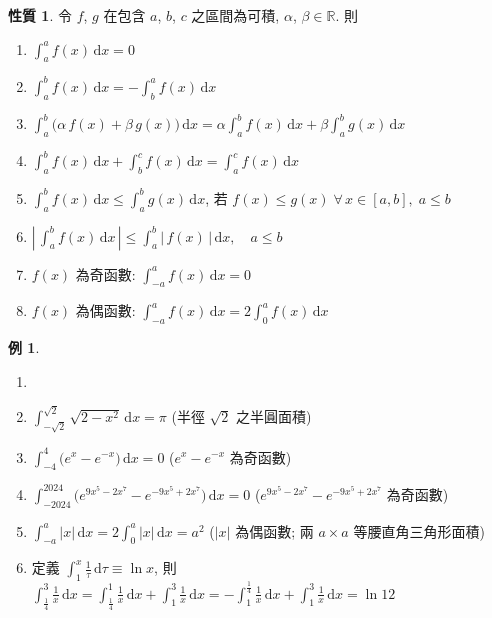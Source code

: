 \documentclass[12pt,a4paper]{extarticle}
\newcommand{\ds}{\displaystyle}
\theoremstyle{definition}
\newtheorem*{prp}{性質}
\newtheorem*{ex}{例}
\begin{document}
\begin{prp}
  令 $f$, $g$ 在包含 $a$, $b$, $c$ 之區間為可積, $\alpha$, $\beta\in\mathbb{R}$. 則
  \begin{multicols}{2}
    \begin{enumerate}\setlength{\itemsep}{0pt}
      \item $\ds\int_a^a f(x)\,\mathrm{d}x = 0$
      \item $\ds\int_a^b f(x)\,\mathrm{d}x = -\int_b^a f(x)\,\mathrm{d}x$
      \item $\ds\int_a^b \big(\alpha\,f(x) + \beta\,g(x)\big)\,\mathrm{d}x = \alpha\int_a^b f(x)\,\mathrm{d}x + \beta\int_a^b g(x)\,\mathrm{d}x$
      \item $\ds\int_a^b f(x)\,\mathrm{d}x + \int_b^c f(x)\,\mathrm{d}x = \int_a^c f(x)\,\mathrm{d}x$
      \item $\ds\int_a^b f(x)\,\mathrm{d}x\leqslant\int_a^b g(x)\,\mathrm{d}x$, 若 $f(x)\leqslant g(x)\;\forall\,x\in[a, b],\;a\leqslant b$
      \item $\ds\left|\,\int_a^b f(x)\,\mathrm{d}x\,\right|\leqslant \int_a^b \left|\,f(x)\,\right|\,\mathrm{d}x, \quad a\leqslant b$ 
      \item $f(x)$ 為奇函數: $\ds\int_{-a}^a f(x)\,\mathrm{d}x = 0$
      \item $f(x)$ 為偶函數: $\ds\int_{-a}^a f(x)\,\mathrm{d}x = 2\int_0^a f(x)\,\mathrm{d}x$
    \end{enumerate}
  \end{multicols}
\end{prp}

\begin{ex}
  \begin{enumerate}\setlength{\itemsep}{0pt}
    \item[]
    \item $\ds\int_{-\sqrt{2}}^{\sqrt{2}} \sqrt{2 - x^2}\,\mathrm{d}x = \pi$ (半徑 $\sqrt{2}$ 之半圓面積) 
    \item $\ds\int_{-4}^{4} \big(e^{x} - e^{-x}\big)\,\mathrm{d}x = 0$ ($e^{x} - e^{-x}$ 為奇函數) 
    \item $\ds\int_{-2024}^{2024} \big(e^{9x^5-2x^7} - e^{-9x^5 + 2x^7}\big)\,\mathrm{d}x = 0$ ($e^{9x^5-2x^7} - e^{-9x^5 + 2x^7}$ 為奇函數)  
    \item $\ds\int_{-a}^a |x|\,\mathrm{d}x = 2\int_0^a |x|\,\mathrm{d}x = a^2$ ($|x|$ 為偶函數; 兩 $a\times a$ 等腰直角三角形面積) 
    \item 定義 $\ds\int_1^x\frac{1}{\tau}\,\mathrm{d}\tau\equiv\ln x$, 則 $\ds\int_{\frac{1}{4}}^3\frac{1}{x}\,\mathrm{d}x = \int_{\frac{1}{4}}^1 \frac{1}{x}\,\mathrm{d}x + \int_1^3 \frac{1}{x}\,\mathrm{d}x = -\int_1^{\frac{1}{4}}\frac{1}{x}\,\mathrm{d}x + \int_1^3\frac{1}{x}\,\mathrm{d}x = \ln 12$
  \end{enumerate}
\end{ex}
\end{document}

